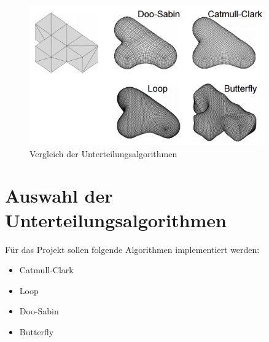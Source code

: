 \begin{figure}
  \centering
  \includegraphics[width=0.9\textwidth]{content/media/sd_overview.png}
  \caption{Vergleich der Unterteilungsalgorithmen \cite{Standford.24.07.2015}}
  \label{fig:sd_comp}
\end{figure}

\section{Auswahl der Unterteilungsalgorithmen}

Für das Projekt sollen folgende Algorithmen implementiert werden:
\begin{itemize}
	\item Catmull-Clark
	\item Loop
	\item Doo-Sabin
	\item Butterfly
\end{itemize}


